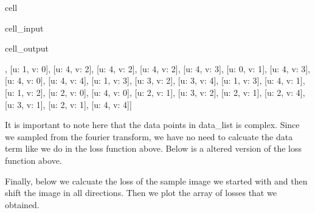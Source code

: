 \documentclass[letterpaper,10pt,english]{jupyterBook}
\begin{document}
\begin{sphinxuseclass}{cell}\begin{sphinxVerbatimInput}

\begin{sphinxuseclass}{cell_input}
\begin{sphinxVerbatim}[commandchars=\\\{\}]
   
\end{sphinxVerbatim}

\end{sphinxuseclass}\end{sphinxVerbatimInput}
\begin{sphinxVerbatimOutput}

\begin{sphinxuseclass}{cell_output}
\begin{sphinxVerbatim}[commandchars=\\\{\}]
[[u: \PYGZhy{}2, v: \PYGZhy{}3],
 [u: 1, v: 0],
 [u: 4, v: \PYGZhy{}2],
 [u: 4, v: \PYGZhy{}2],
 [u: \PYGZhy{}4, v: 2],
 [u: 4, v: 3],
 [u: 0, v: 1],
 [u: 4, v: \PYGZhy{}3],
 [u: 4, v: 0],
 [u: \PYGZhy{}4, v: 4],
 [u: 1, v: \PYGZhy{}3],
 [u: \PYGZhy{}3, v: \PYGZhy{}2],
 [u: 3, v: \PYGZhy{}4],
 [u: 1, v: \PYGZhy{}3],
 [u: \PYGZhy{}4, v: \PYGZhy{}1],
 [u: 1, v: \PYGZhy{}2],
 [u: 2, v: 0],
 [u: 4, v: 0],
 [u: 2, v: \PYGZhy{}1],
 [u: \PYGZhy{}3, v: \PYGZhy{}2],
 [u: 2, v: 1],
 [u: 2, v: \PYGZhy{}4],
 [u: 3, v: 1],
 [u: \PYGZhy{}2, v: 1],
 [u: 4, v: 4]]
\end{sphinxVerbatim}

\end{sphinxuseclass}\end{sphinxVerbatimOutput}

\end{sphinxuseclass}
\sphinxAtStartPar
It is important to note here that the data points in data\_list is complex. Since we sampled from the fourier transform, we have no need to calcuate the data term like we do in the loss function above. Below is a altered version of the loss function above.

\sphinxAtStartPar
Finally, below we calcuate the loss of the sample image we started with and then shift the image in all directions. Then we plot the array of losses that we obtained.
\end{document}
